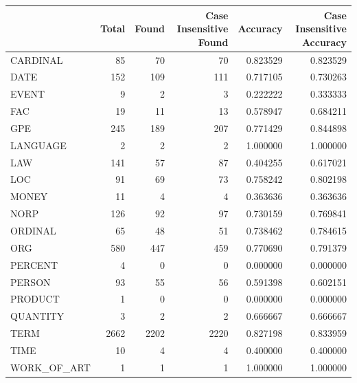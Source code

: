 \begin{tabular}{lrrrrr}
\toprule
 & Total & Found & Case Insensitive Found & Accuracy & Case Insensitive Accuracy \\
\midrule
CARDINAL & 85 & 70 & 70 & 0.823529 & 0.823529 \\
DATE & 152 & 109 & 111 & 0.717105 & 0.730263 \\
EVENT & 9 & 2 & 3 & 0.222222 & 0.333333 \\
FAC & 19 & 11 & 13 & 0.578947 & 0.684211 \\
GPE & 245 & 189 & 207 & 0.771429 & 0.844898 \\
LANGUAGE & 2 & 2 & 2 & 1.000000 & 1.000000 \\
LAW & 141 & 57 & 87 & 0.404255 & 0.617021 \\
LOC & 91 & 69 & 73 & 0.758242 & 0.802198 \\
MONEY & 11 & 4 & 4 & 0.363636 & 0.363636 \\
NORP & 126 & 92 & 97 & 0.730159 & 0.769841 \\
ORDINAL & 65 & 48 & 51 & 0.738462 & 0.784615 \\
ORG & 580 & 447 & 459 & 0.770690 & 0.791379 \\
PERCENT & 4 & 0 & 0 & 0.000000 & 0.000000 \\
PERSON & 93 & 55 & 56 & 0.591398 & 0.602151 \\
PRODUCT & 1 & 0 & 0 & 0.000000 & 0.000000 \\
QUANTITY & 3 & 2 & 2 & 0.666667 & 0.666667 \\
TERM & 2662 & 2202 & 2220 & 0.827198 & 0.833959 \\
TIME & 10 & 4 & 4 & 0.400000 & 0.400000 \\
WORK_OF_ART & 1 & 1 & 1 & 1.000000 & 1.000000 \\
\bottomrule
\end{tabular}
